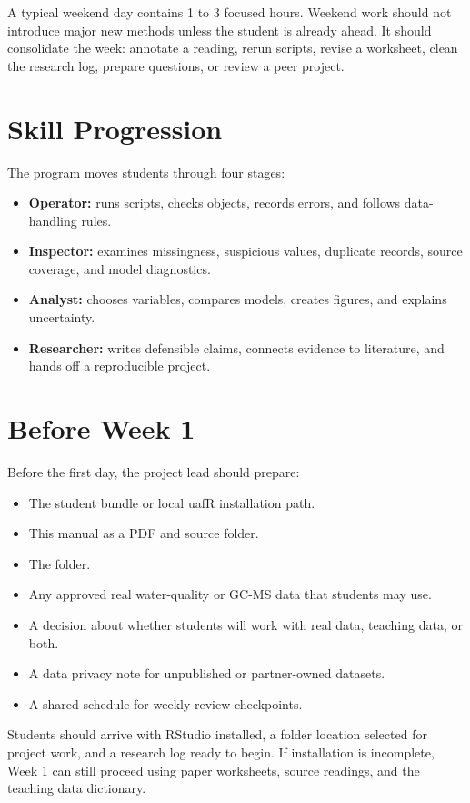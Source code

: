 A typical weekend day contains 1 to 3 focused hours. Weekend work should not introduce major new methods unless the student is already ahead. It should consolidate the week: annotate a reading, rerun scripts, revise a worksheet, clean the research log, prepare questions, or review a peer project.

\section{Skill Progression}

The program moves students through four stages:
\begin{itemize}
  \item \textbf{Operator:} runs scripts, checks objects, records errors, and follows data-handling rules.
  \item \textbf{Inspector:} examines missingness, suspicious values, duplicate records, source coverage, and model diagnostics.
  \item \textbf{Analyst:} chooses variables, compares models, creates figures, and explains uncertainty.
  \item \textbf{Researcher:} writes defensible claims, connects evidence to literature, and hands off a reproducible project.
\end{itemize}

\section{Before Week 1}

Before the first day, the project lead should prepare:
\begin{itemize}
  \item The student bundle or local uafR installation path.
  \item This manual as a PDF and source folder.
  \item The  folder.
  \item Any approved real water-quality or GC-MS data that students may use.
  \item A decision about whether students will work with real data, teaching data, or both.
  \item A data privacy note for unpublished or partner-owned datasets.
  \item A shared schedule for weekly review checkpoints.
\end{itemize}

Students should arrive with RStudio installed, a folder location selected for project work, and a research log ready to begin. If installation is incomplete, Week 1 can still proceed using paper worksheets, source readings, and the teaching data dictionary.

